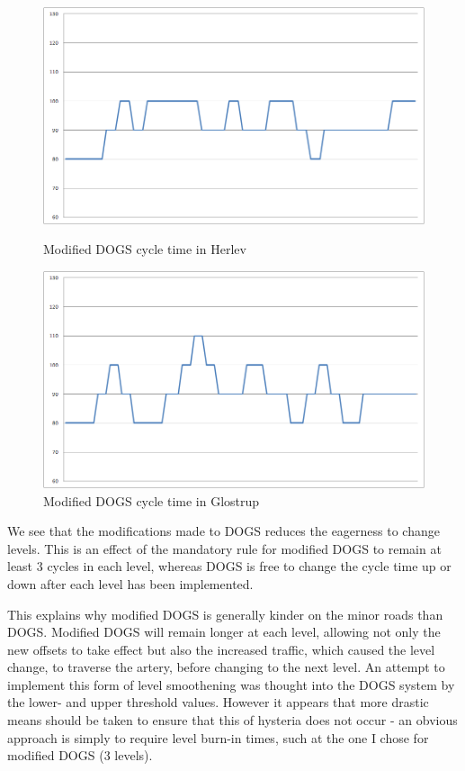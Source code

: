 \begin{figure}[ht]
\begin{minipage}[b]{0.5\linewidth}
\centering
\includegraphics[scale=0.2]{C_modified-dogs_herlev.png}
\caption{Modified DOGS cycle time in Herlev}
\label{fig:c_modified-dogs_herlev}

    \end{minipage}
    \hspace{0.1cm}
    \begin{minipage}[b]{0.5\linewidth}

\centering
\includegraphics[scale=0.2]{C_modified-dogs_glostrup.png}
\caption{Modified DOGS cycle time in Glostrup}
\label{fig:c_modified-dogs_glostrup}

    \end{minipage}

\end{figure}

We see that the modifications made to DOGS reduces the eagerness to change levels. This is an effect of the mandatory rule for modified DOGS to remain at least 3 cycles in each level, whereas DOGS is free to change the cycle time up or down after each level has been implemented. 

This explains why modified DOGS is generally kinder on the minor roads than DOGS. Modified DOGS will remain longer at each level, allowing not only the new offsets to take effect but also the increased traffic, which caused the level change, to traverse the artery, before changing to the next level. An attempt to implement this form of level smoothening was thought into the DOGS system by the lower- and upper threshold values. However it appears that more drastic means should be taken to ensure that this of hysteria does not occur - an obvious approach is simply to require level burn-in times, such at the one I chose for modified DOGS (3 levels).

